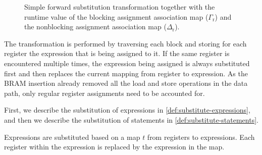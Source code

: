\begin{figure}
  \caption{Simple forward substitution transformation together with the runtime
    value of the blocking assignment association map ($\Gamma_{\mathrm r}$) and
    the nonblocking assignment association map ($\Delta_{\mathrm r}$).}%
  \label{fig:hg:forward-substitution}
\end{figure}

\newcommand\substmap{t}
\newcommand\substexpr[2]{\texttt{subst\_expr}\ #1\ #2}
\newcommand\subststmnt[2]{\texttt{subst\_stmnt}\ #1\ #2}
\newcommand\invinsubstmap[4]{\texttt{in\_subst\_map}\ #1\ #2\ #3\ #4}
\newcommand\invnotinsubstmap[3]{\texttt{not\_in\_subst\_map}\ #1\ #2\ #3}

The transformation is performed by traversing each block and storing for each
register the expression that is being assigned to it.  If the same register is
encountered multiple times, the expression being assigned is always substituted
first and then replaces the current mapping from register to expression.  As the
BRAM insertion already removed all the load and store operations in the data
path, only regular register assignments need to be accounted for.

First, we describe the substitution of expressions in
\cref{def:substitute-expressions}, and then we describe the substitution of
statements in \cref{def:substitute-statements}.

\begin{definition}%
  \label{def:substitute-expressions}

  Expressions are substituted based on a map $\substmap$ from registers to
  expressions.  Each register within the expression is replaced by the
  expression in the map.

\end{definition}

